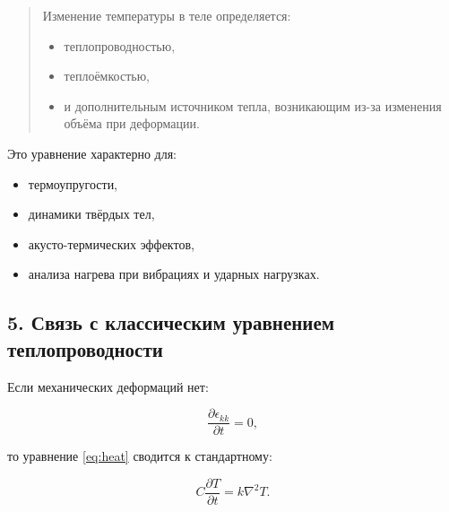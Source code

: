 \begin{quote}
Изменение температуры в теле определяется:
\begin{itemize}
    \item теплопроводностью,
    \item теплоёмкостью,
    \item и дополнительным источником тепла, возникающим из-за изменения объёма при деформации.
\end{itemize}
\end{quote}

Это уравнение характерно для:

\begin{itemize}
    \item термоупругости,
    \item динамики твёрдых тел,
    \item акусто-термических эффектов,
    \item анализа нагрева при вибрациях и ударных нагрузках.
\end{itemize}

\subsection{5. Связь с классическим уравнением теплопроводности}

Если механических деформаций нет:

\[
\frac{\partial \epsilon_{kk}}{\partial t} = 0,
\]

то уравнение \eqref{eq:heat} сводится к стандартному:

\[
C \frac{\partial T}{\partial t} = k \nabla^2 T.
\]
